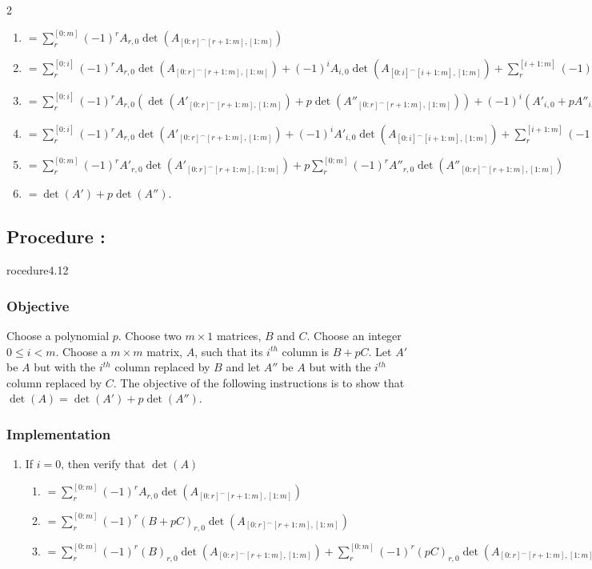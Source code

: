 \documentclass{article}
\newcounter{procedure}[part]
\newcommand{\procedure}[1]{\subsection*{Procedure \thepart:\theprocedure}\label{sec:procedure #1}\global\expandafter\edef\csname procedure#1\endcsname{\thepart:\theprocedure}\addtocounter{procedure}{1}}
\newcommand{\objective}{\subsubsection*{Objective}}
\newcommand{\implementation}{\subsubsection*{Implementation}}
\begin{document}
\begin{multicols}{2}
\begin{enumerate}
\begin{enumerate}
						\begin{enumerate}
							\item $=\sum_r^{[0:m]} (-1)^rA_{r,0}\det(A_{[0:r]^\frown[r+1:m],[1:m]})$
							\item $=\sum_r^{[0:i]} (-1)^rA_{r,0}\det(A_{[0:r]^\frown[r+1:m],[1:m]})+(-1)^iA_{i,0}\det(A_{[0:i]^\frown[i+1:m],[1:m]})+\sum_r^{[i+1:m]} (-1)^rA_{r,0}\det(A_{[0:r]^\frown[r+1:m],[1:m]})$
							\item $=\sum_r^{[0:i]} (-1)^rA_{r,0}(\det(A'_{[0:r]^\frown[r+1:m],[1:m]})+p\det(A''_{[0:r]^\frown[r+1:m],[1:m]}))+(-1)^i(A'_{i,0}+pA''_{i,0})\det(A_{[0:i]^\frown[i+1:m],[1:m]})+\sum_r^{[i+1:m]} (-1)^rA_{r,0}(\det(A'_{[0:r]^\frown[r+1:m],[1:m]})+p\det(A''_{[0:r]^\frown[r+1:m],[1:m]}))$
							\item $=\sum_r^{[0:i]} (-1)^rA_{r,0}\det(A'_{[0:r]^\frown[r+1:m],[1:m]})+(-1)^iA'_{i,0}\det(A_{[0:i]^\frown[i+1:m],[1:m]})+\sum_r^{[i+1:m]} (-1)^rA_{r,0}\det(A'_{[0:r]^\frown[r+1:m],[1:m]})
								+\sum_r^{[0:i]} (-1)^rA_{r,0}p\det(A''_{[0:r]^\frown[r+1:m],[1:m]})+(-1)^ipA''_{i,0}\det(A_{[0:i]^\frown[i+1:m],[1:m]})+\sum_r^{[i+1:m]} (-1)^rA_{r,0}p\det(A''_{[0:r]^\frown[r+1:m],[1:m]})$
							\item $=\sum_r^{[0:m]} (-1)^rA'_{r,0}\det(A'_{[0:r]^\frown[r+1:m],[1:m]})+p\sum_r^{[0:m]} (-1)^rA''_{r,0}\det(A''_{[0:r]^\frown[r+1:m],[1:m]})$
							\item $=\det(A')+p\det(A'')$.
						\end{enumerate}
					\end{enumerate}
				\end{enumerate}
		\procedure{4.12}
			\objective
				Choose a polynomial $p$. Choose two $m\times 1$ matrices, $B$ and $C$. Choose an integer $0\le i<m$. Choose a $m\times m$ matrix, $A$, such that its $i^{th}$ column is $B+pC$. Let $A'$ be $A$ but with the $i^{th}$ column replaced by $B$ and let $A''$ be $A$ but with the $i^{th}$ column replaced by $C$. The objective of the following instructions is to show that $\det(A)=\det(A')+p\det(A'')$.
			\implementation
				\begin{enumerate}
					\item If $i=0$, then verify that $\det(A)$
					\begin{enumerate}
						\item $=\sum_r^{[0:m]} (-1)^{r}A_{r,0}\det(A_{[0:r]^\frown[r+1:m],[1:m]})$
						\item $=\sum_r^{[0:m]} (-1)^{r}(B+pC)_{r,0}\det(A_{[0:r]^\frown[r+1:m],[1:m]})$
						\item $=\sum_r^{[0:m]} (-1)^{r}(B)_{r,0}\det(A_{[0:r]^\frown[r+1:m],[1:m]})+\sum_r^{[0:m]} (-1)^{r}(pC)_{r,0}\det(A_{[0:r]^\frown[r+1:m],[1:m]})$

\end{enumerate}
\end{enumerate}
\end{multicols}
\end{document}

